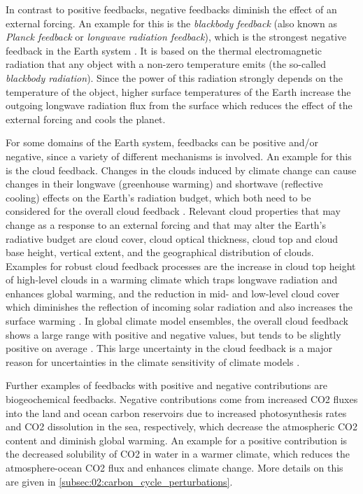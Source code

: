 In contrast to positive feedbacks, negative feedbacks diminish the effect of an
external forcing. An example for this is the \emph{blackbody feedback} (also
known as \emph{Planck feedback} or \emph{longwave radiation feedback}), which
is the strongest negative feedback in the Earth system \autocite{Cubasch2013}.
It is based on the thermal electromagnetic radiation that any object with a
non-zero temperature emits (the so-called \emph{blackbody radiation}). Since
the power of this radiation strongly depends on the temperature of the object,
higher surface temperatures of the Earth increase the outgoing longwave
radiation flux from the surface which reduces the effect of the external
forcing and cools the planet.

For some domains of the Earth system, feedbacks can be positive and/or
negative, since a variety of different mechanisms is involved. An example for
this is the cloud feedback. Changes in the clouds induced by climate change can
cause changes in their longwave (greenhouse warming) and shortwave (reflective
cooling) effects on the Earth's radiation budget, which both need to be
considered for the overall cloud feedback \autocite{Boucher2013}. Relevant
cloud properties that may change as a response to an external forcing and that
may alter the Earth's radiative budget are cloud cover, cloud optical
thickness, cloud top and cloud base height, vertical extent, and the
geographical distribution of clouds. Examples for robust cloud feedback
processes are the increase in cloud top height of high-level clouds in a
warming climate which traps longwave radiation and enhances global warming, and
the reduction in mid- and low-level cloud cover which diminishes the reflection
of incoming solar radiation and also increases the surface warming
\autocite{Boucher2013}. In global climate model ensembles, the overall cloud
feedback shows a large range with positive and negative values, but tends to be
slightly positive on average \autocite{Soden2006, Dufresne2008, Vial2013,
  Zelinka2020}. This large uncertainty in the cloud feedback is a major reason
for uncertainties in the climate sensitivity of climate models
\autocite{Boucher2013, Flato2013}.

Further examples of feedbacks with positive and negative contributions are
biogeochemical feedbacks. Negative contributions come from increased \ac{CO2}
fluxes into the land and ocean carbon reservoirs due to increased
photosynthesis rates and \ac{CO2} dissolution in the sea, respectively, which
decrease the atmospheric \ac{CO2} content and diminish global warming. An
example for a positive contribution is the decreased solubility of \ac{CO2} in
water in a warmer climate, which reduces the atmosphere-ocean \ac{CO2} flux and
enhances climate change. More details on this are given in
\cref{subsec:02:carbon_cycle_perturbations}.


